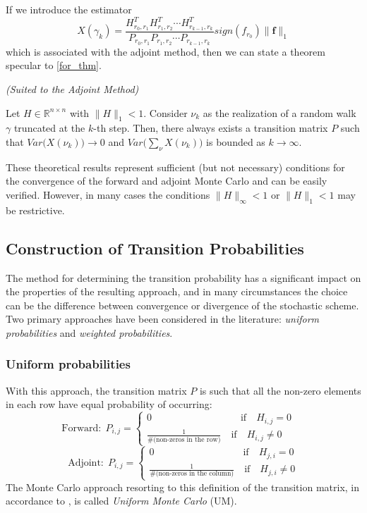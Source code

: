 If we introduce the estimator
\[
 X(\gamma_k)=\frac{H^T_{r_0,r_1}H^T_{r_1,r_2}\cdots
H^T_{r_{k-1},r_k}}{P_{r_0,r_1}P_{r_1,r_2}\cdots
P_{r_{k-1},r_k}}sign(f_{r_0})\lVert \mathbf{f}\rVert_1
\]
which is associated with the adjoint method, then we can state a
theorem specular to \ref{for_thm}.

\begin{thm}\textit{(Suited to the Adjoint Method)}

 Let $H\in \mathbb{R}^{n\times n}$ with $\lVert H\rVert_{1}<1$.
Consider $\nu_k$ as the realization of a random walk $\gamma$ truncated at the
$k$-th step. Then,
there always exists a
transition matrix $P$ such that
$Var\Big(X(\nu_k)\Big)\rightarrow 0$ and
$Var\Big(\sum_{\nu}X(\nu_k)\Big)$ is bounded as $k\rightarrow \infty$.
\label{adj_thm}
\end{thm}

These theoretical results represent sufficient (but not necessary) conditions
for the convergence
of the forward and adjoint Monte Carlo and can be easily verified.
However, in many cases the conditions $\lVert H\rVert_{\infty}<1$ or
$\lVert H\rVert_1<1$ may be restrictive.

\subsection{Construction of Transition Probabilities}

The method for determining the transition probability has a significant impact
on the properties of the resulting approach, and in many circumstances the
choice can be the difference between convergence or divergence of the stochastic
scheme.  Two primary approaches have been considered in the literature:
\textit{uniform probabilities} and \textit{weighted probabilities}.

\subsubsection{Uniform probabilities}

With this approach, the transition matrix $P$ is such that all the non-zero elements
in each row have equal probability of occurring:
\[
\text{Forward}:\;P_{i,j}=
\begin{cases}
0 \quad \quad \quad \qquad \qquad \qquad \text{if}\quad H_{i,j}=0 \\
\frac{1}{\#(\text{non-zeros in the row)}} \quad \text{if} \quad H_{i,j}\ne 0
\end{cases}\quad
\]
\[
\text{Adjoint}:\;P_{i,j}=
\begin{cases}
0 \quad \quad \quad \qquad \qquad \qquad \text{if}\quad H_{j,i}=0 \\
\frac{1}{\#(\text{non-zeros in the column)}} \quad \text{if} \quad H_{j,i}\ne 0
\end{cases}
\]
The Monte Carlo approach resorting to this definition of the transition matrix,
in accordance to \cite{AADBTW2005}, is called \textit{Uniform Monte Carlo} (UM).


